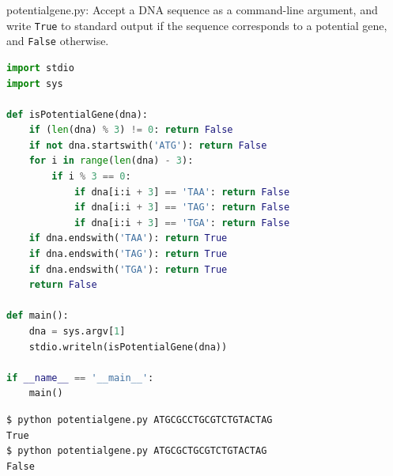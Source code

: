 \documentclass[8pt,a4paper,compress]{beamer}
\begin{document}
\begin{frame}[fragile]
\pause

\begin{framed}
\tiny potentialgene.py: Accept a DNA sequence as a command-line argument, and write \lstinline{True} to standard output if the sequence corresponds to a potential gene, and \lstinline{False} otherwise.
\end{framed}

\begin{lstlisting}[language=Python]
import stdio
import sys

def isPotentialGene(dna):
    if (len(dna) % 3) != 0: return False
    if not dna.startswith('ATG'): return False
    for i in range(len(dna) - 3):
        if i % 3 == 0:
            if dna[i:i + 3] == 'TAA': return False
            if dna[i:i + 3] == 'TAG': return False
            if dna[i:i + 3] == 'TGA': return False
    if dna.endswith('TAA'): return True
    if dna.endswith('TAG'): return True
    if dna.endswith('TGA'): return True
    return False

def main():
    dna = sys.argv[1]
    stdio.writeln(isPotentialGene(dna))

if __name__ == '__main__':
    main()
\end{lstlisting}

\pause

\begin{lstlisting}[language={}]
$ python potentialgene.py ATGCGCCTGCGTCTGTACTAG
True
$ python potentialgene.py ATGCGCTGCGTCTGTACTAG
False
\end{lstlisting}
\end{frame}
\end{document}
